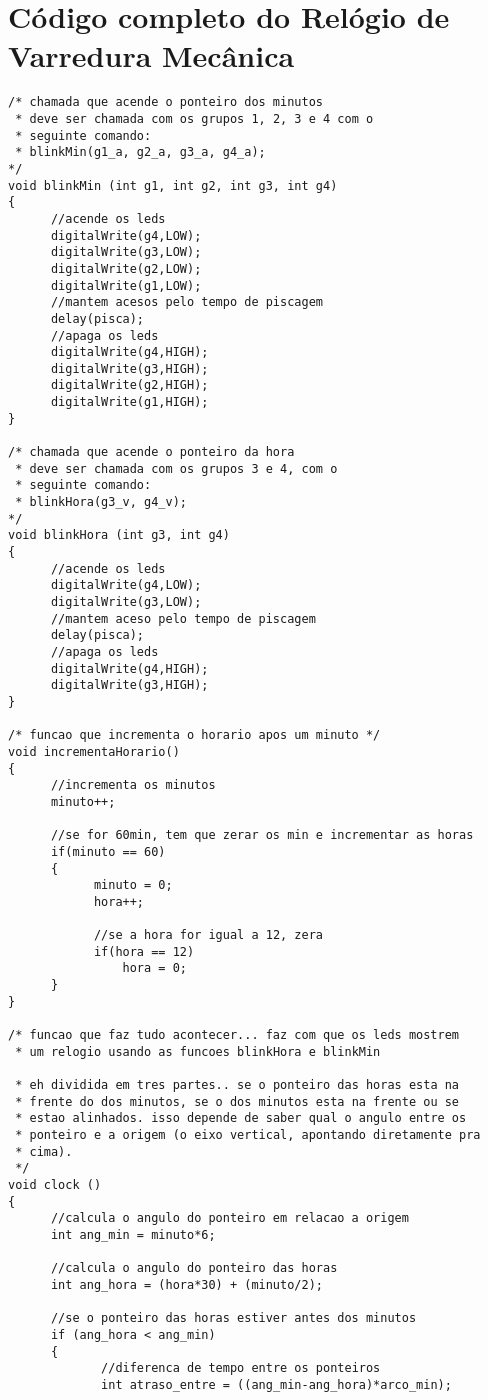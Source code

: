 \chapter{Código completo do Relógio de Varredura Mecânica}

\begin{lstlisting}
/* chamada que acende o ponteiro dos minutos
 * deve ser chamada com os grupos 1, 2, 3 e 4 com o
 * seguinte comando:
 * blinkMin(g1_a, g2_a, g3_a, g4_a);
*/
void blinkMin (int g1, int g2, int g3, int g4)
{
      //acende os leds
      digitalWrite(g4,LOW);
      digitalWrite(g3,LOW);
      digitalWrite(g2,LOW);
      digitalWrite(g1,LOW);
      //mantem acesos pelo tempo de piscagem
      delay(pisca);
      //apaga os leds
      digitalWrite(g4,HIGH);
      digitalWrite(g3,HIGH);
      digitalWrite(g2,HIGH);
      digitalWrite(g1,HIGH);
}

/* chamada que acende o ponteiro da hora
 * deve ser chamada com os grupos 3 e 4, com o
 * seguinte comando:
 * blinkHora(g3_v, g4_v);
*/
void blinkHora (int g3, int g4)
{
      //acende os leds
      digitalWrite(g4,LOW);
      digitalWrite(g3,LOW);
      //mantem aceso pelo tempo de piscagem
      delay(pisca);
      //apaga os leds
      digitalWrite(g4,HIGH);
      digitalWrite(g3,HIGH);
}

/* funcao que incrementa o horario apos um minuto */
void incrementaHorario()
{
      //incrementa os minutos
      minuto++;

      //se for 60min, tem que zerar os min e incrementar as horas
      if(minuto == 60)
      {
            minuto = 0;
            hora++;

            //se a hora for igual a 12, zera
            if(hora == 12)
                hora = 0;
      }
}

/* funcao que faz tudo acontecer... faz com que os leds mostrem
 * um relogio usando as funcoes blinkHora e blinkMin

 * eh dividida em tres partes.. se o ponteiro das horas esta na
 * frente do dos minutos, se o dos minutos esta na frente ou se
 * estao alinhados. isso depende de saber qual o angulo entre os
 * ponteiro e a origem (o eixo vertical, apontando diretamente pra
 * cima).
 */
void clock ()
{
      //calcula o angulo do ponteiro em relacao a origem
      int ang_min = minuto*6;

      //calcula o angulo do ponteiro das horas
      int ang_hora = (hora*30) + (minuto/2);

      //se o ponteiro das horas estiver antes dos minutos
      if (ang_hora < ang_min)
      {
             //diferenca de tempo entre os ponteiros
             int atraso_entre = ((ang_min-ang_hora)*arco_min);


\end{lstlisting}

